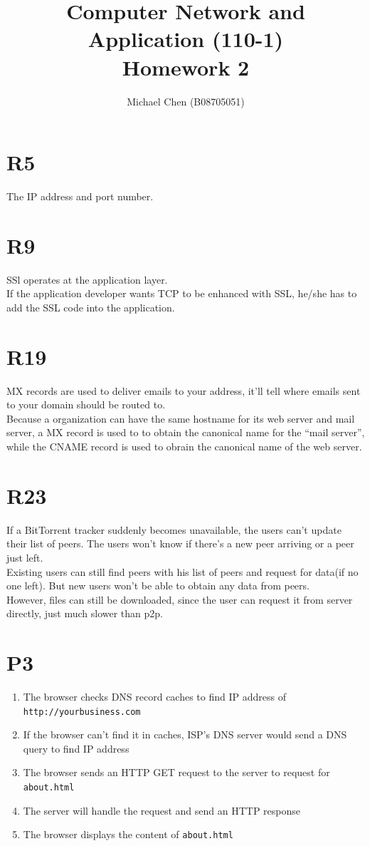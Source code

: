 \documentclass[11pt,a4paper]{article}
\title{Computer Network and Application (110-1) \\ Homework 2}
\author{Michael Chen (B08705051)}
\date{}
\begin{document}
\maketitle

\section{R5}
The IP address and port number.

\section{R9}
SSl operates at the application layer.\\
If the application developer wants TCP to be enhanced with SSL, he/she has to add the SSL code into the application.

\section{R19}
MX records are used to deliver emails to your address, it'll tell where emails sent to your domain should be routed to.\\
Because a organization can have the same hostname for its web server and mail server, a MX record is used to  to obtain the 
canonical name for the “mail server”, while the CNAME record is used to obrain the canonical name of the web server.

\section{R23}
If a BitTorrent tracker suddenly becomes unavailable, the users can't update their list of peers. The users won't know if 
there's a new peer arriving or a peer just left.\\
Existing users can still find peers with his list of peers and request for data(if no one left). But new users won't be able 
to obtain any data from peers.\\
However, files can still be downloaded, since the user can request it from server directly, just much slower than p2p.

\section{P3}
\begin{enumerate}
    \item The browser checks DNS record caches to find IP address of \texttt{http://yourbusiness.com}
    \item If the browser can't find it in caches, ISP's DNS server would send a DNS query to find IP address
    \item The browser sends an HTTP GET request to the server to request for \texttt{about.html}
    \item The server will handle the request and send an HTTP response
    \item The browser displays the content of \texttt{about.html}
\end{enumerate}
\end{document}
